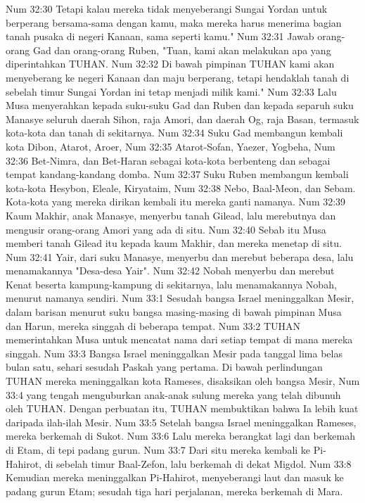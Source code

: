 Num 32:30  Tetapi kalau mereka tidak menyeberangi Sungai Yordan untuk berperang bersama-sama dengan kamu, maka mereka harus menerima bagian tanah pusaka di negeri Kanaan, sama seperti kamu."
Num 32:31  Jawab orang-orang Gad dan orang-orang Ruben, "Tuan, kami akan melakukan apa yang diperintahkan TUHAN.
Num 32:32  Di bawah pimpinan TUHAN kami akan menyeberang ke negeri Kanaan dan maju berperang, tetapi hendaklah tanah di sebelah timur Sungai Yordan ini tetap menjadi milik kami."
Num 32:33  Lalu Musa menyerahkan kepada suku-suku Gad dan Ruben dan kepada separuh suku Manasye seluruh daerah Sihon, raja Amori, dan daerah Og, raja Basan, termasuk kota-kota dan tanah di sekitarnya.
Num 32:34  Suku Gad membangun kembali kota Dibon, Atarot, Aroer,
Num 32:35  Atarot-Sofan, Yaezer, Yogbeha,
Num 32:36  Bet-Nimra, dan Bet-Haran sebagai kota-kota berbenteng dan sebagai tempat kandang-kandang domba.
Num 32:37  Suku Ruben membangun kembali kota-kota Hesybon, Eleale, Kiryataim,
Num 32:38  Nebo, Baal-Meon, dan Sebam. Kota-kota yang mereka dirikan kembali itu mereka ganti namanya.
Num 32:39  Kaum Makhir, anak Manasye, menyerbu tanah Gilead, lalu merebutnya dan mengusir orang-orang Amori yang ada di situ.
Num 32:40  Sebab itu Musa memberi tanah Gilead itu kepada kaum Makhir, dan mereka menetap di situ.
Num 32:41  Yair, dari suku Manasye, menyerbu dan merebut beberapa desa, lalu menamakannya "Desa-desa Yair".
Num 32:42  Nobah menyerbu dan merebut Kenat beserta kampung-kampung di sekitarnya, lalu menamakannya Nobah, menurut namanya sendiri.
Num 33:1  Sesudah bangsa Israel meninggalkan Mesir, dalam barisan menurut suku bangsa masing-masing di bawah pimpinan Musa dan Harun, mereka singgah di beberapa tempat.
Num 33:2  TUHAN memerintahkan Musa untuk mencatat nama dari setiap tempat di mana mereka singgah.
Num 33:3  Bangsa Israel meninggalkan Mesir pada tanggal lima belas bulan satu, sehari sesudah Paskah yang pertama. Di bawah perlindungan TUHAN mereka meninggalkan kota Rameses, disaksikan oleh bangsa Mesir,
Num 33:4  yang tengah menguburkan anak-anak sulung mereka yang telah dibunuh oleh TUHAN. Dengan perbuatan itu, TUHAN membuktikan bahwa Ia lebih kuat daripada ilah-ilah Mesir.
Num 33:5  Setelah bangsa Israel meninggalkan Rameses, mereka berkemah di Sukot.
Num 33:6  Lalu mereka berangkat lagi dan berkemah di Etam, di tepi padang gurun.
Num 33:7  Dari situ mereka kembali ke Pi-Hahirot, di sebelah timur Baal-Zefon, lalu berkemah di dekat Migdol.
Num 33:8  Kemudian mereka meninggalkan Pi-Hahirot, menyeberangi laut dan masuk ke padang gurun Etam; sesudah tiga hari perjalanan, mereka berkemah di Mara.
